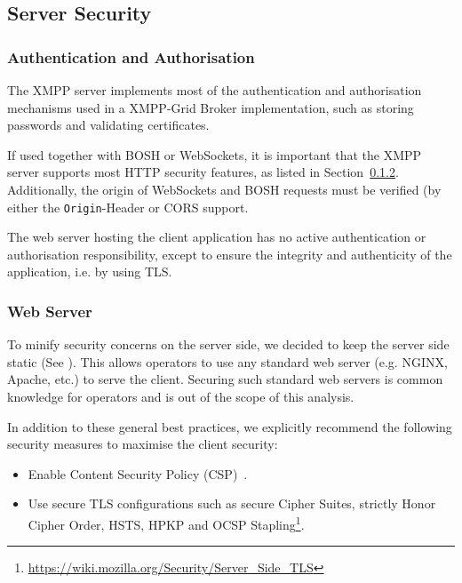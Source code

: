 \subsection{Server Security}

\subsubsection{Authentication and Authorisation}

The XMPP server implements most of the authentication and authorisation mechanisms used in a XMPP-Grid Broker implementation, such as storing passwords and validating certificates.

If used together with BOSH or WebSockets, it is important that the XMPP server supports most HTTP security features, as listed in Section~\ref{sec:web-server}. Additionally, the origin of WebSockets and BOSH requests must be verified (by either the \texttt{Origin}-Header or CORS support.~\cite{rfc6455}\cite{cross-origin-resource-sharing}

The web server hosting the client application has no active authentication or authorisation responsibility, except to ensure the integrity and authenticity of the application, i.e. by using TLS.

\subsubsection{Web Server}\label{sec:web-server}

To minify security concerns on the server side, we decided to keep the server side static (See ).
This allows operators to use any standard web server (e.g. NGINX, Apache, etc.) to serve the client.
Securing such standard web servers is common knowledge for operators and is out of the scope of this analysis.

In addition to these general best practices, we explicitly recommend the following security measures to maximise the client security:

\begin{itemize}
    \item Enable Content Security Policy (CSP)~\cite{w3c-csp}.
    \item Use secure TLS configurations such as secure Cipher Suites, strictly Honor Cipher Order, HSTS, HPKP and OCSP Stapling\footnote{\url{https://wiki.mozilla.org/Security/Server_Side_TLS}}.
\end{itemize}


